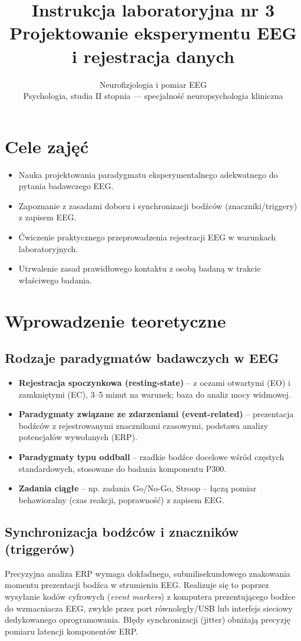 \documentclass[11pt,a4paper]{article}
\title{\vspace{-1.5cm}\textbf{\color{navy}Instrukcja laboratoryjna nr 3}\\[4pt]
\Large Projektowanie eksperymentu EEG i rejestracja danych}
\author{Neurofizjologia i pomiar EEG\\ Psychologia, studia II stopnia --- specjalność neuropsychologia kliniczna}
\begin{document}
\maketitle
\thispagestyle{fancy}

\section{Cele zajęć}
\begin{itemize}[nosep]
  \item Nauka projektowania paradygmatu eksperymentalnego adekwatnego do pytania badawczego EEG.
  \item Zapoznanie z zasadami doboru i synchronizacji bodźców (znaczniki/triggery) z zapisem EEG.
  \item Ćwiczenie praktycznego przeprowadzenia rejestracji EEG w warunkach laboratoryjnych.
  \item Utrwalenie zasad prawidłowego kontaktu z osobą badaną w trakcie właściwego badania.
\end{itemize}

\section{Wprowadzenie teoretyczne}

\subsection{Rodzaje paradygmatów badawczych w EEG}
\begin{itemize}[nosep]
  \item \textbf{Rejestracja spoczynkowa (resting-state)} -- z oczami otwartymi (EO) i zamkniętymi (EC), 3--5 minut na warunek; baza do analiz mocy widmowej.
  \item \textbf{Paradygmaty związane ze zdarzeniami (event-related)} -- prezentacja bodźców z rejestrowanymi znacznikami czasowymi, podstawa analizy potencjałów wywołanych (ERP).
  \item \textbf{Paradygmaty typu oddball} -- rzadkie bodźce docelowe wśród częstych standardowych, stosowane do badania komponentu P300.
  \item \textbf{Zadania ciągłe} -- np. zadania Go/No-Go, Stroop -- łączą pomiar behawioralny (czas reakcji, poprawność) z zapisem EEG.
\end{itemize}

\subsection{Synchronizacja bodźców i znaczników (triggerów)}
Precyzyjna analiza ERP wymaga dokładnego, submilisekundowego znakowania momentu prezentacji bodźca w strumieniu EEG. Realizuje się to poprzez wysyłanie kodów cyfrowych (\emph{event markers}) z komputera prezentującego bodźce do wzmacniacza EEG, zwykle przez port równoległy/USB lub interfejs sieciowy dedykowanego oprogramowania. Błędy synchronizacji (jitter) obniżają precyzję pomiaru latencji komponentów ERP.
\end{document}
